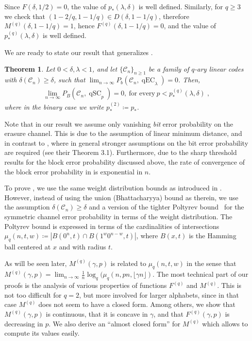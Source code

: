 \documentclass{article}
\DeclareMathOperator{\qSC}{qSC}
\DeclareMathOperator{\qEC}{qEC}
\newcommand{\cC}{\mathcal{C}}
\theoremstyle{plain}
\theoremstyle{plain}
\newtheorem{theorem}[definition]{Theorem}%
\theoremstyle{plain}
\theoremstyle{plain}
\theoremstyle{plain}
\theoremstyle{plain}
\theoremstyle{plain}
\theoremstyle{plain}
\theoremstyle{plain}
\theoremstyle{plain}
\theoremstyle{remark}
\theoremstyle{remark}
\theoremstyle{remark}
\theoremstyle{plain}
\begin{document}
Since $F(\delta,1/2)=0$, the value of
$p_{*}(\lambda,\delta)$ is well defined.
Similarly, for $q\ge 3$ we check that
$(1-2/q,1-1/q)\in D(\delta,1-1/q)$, therefore
$M^{(q)}(\delta,1-1/q)=1$,
hence $F^{(q)}(\delta,1-1/q)=0$, and
the value of $p_{*}^{(q)}(\lambda,\delta)$ is well defined.

We are ready to state our result
that generalizes .

\begin{theorem}
\label{Thm:1}
   Let $0<\delta,\lambda<1$, and let $\{\mathcal{C}_n\}_{n\ge1}$ be a family of $q$-ary linear codes with $\delta(\cC_n)\ge\delta$, such that $\lim_{n\to\infty}P_b(\cC_n,\qEC_{\lambda})=0$.
   Then,  
   \begin{align*}
       \underset{n\to\infty}{\lim}P_B(\cC_n,\qSC_p)=0,\ \text{for every}\ p<p_{*}^{(q)}(\lambda,\delta)\;,
   \end{align*}
   where in the binary case we write
   $p_*^{(2)}\coloneqq p_*$.
\end{theorem}

Note that in our result we assume only vanishing
\emph{bit} error probability on the erasure channel. This is due to the
assumption of linear minimum distance, and in contrast to 
\cite{hkazla2021codes}, where in general stronger assumptions 
on the bit error probability are required (see their Theorem 3.1).
Furthermore, due to the 
sharp threshold results for the block error probability discussed above, the rate of
convergence of the block error probability in 
is exponential in $n$.

To prove , we use the same weight distribution
bounds as introduced in \cite{hkazla2021codes,abawonse2025generalized}.
However, instead of using the union 
(Bhattacharyya) bound
as therein, we use the assumption $\delta(\cC_n)\ge\delta$ and a
version of the tighter 
Poltyrev bound~\cite{poltyrev2002bounds,pathegama2023smoothing}
for the symmetric channel error probability in terms of the weight distribution.
The Poltyrev bound is expressed in terms of the cardinalities of
intersections 
$\mu_q(n,t,w)\coloneqq|B(0^n,t)\cap B(1^w0^{n-w},t)|$, where $B(x,t)$ is the Hamming ball
centered at $x$ and with radius $t$. 

As will be seen later, $M^{(q)}(\gamma,p)$ is related
to $\mu_q(n,t,w)$ in the sense that 
$M^{(q)}(\gamma,p)=\lim_{n\to\infty}\frac{1}{n}\log_q(\mu_q(n,\allowbreak pn,\lfloor \gamma n\rfloor)$.
The most technical part of our proofs is
the analysis of various properties of
functions $F^{(q)}$ and
$M^{(q)}$. This is not too difficult for $q=2$,
but more involved for larger alphabets, since
in that case $M^{(q)}$ does not seem to have a closed form. Among others,
we show that $M^{(q)}(\gamma,p)$
is continuous, that it is concave in $\gamma$, 
and that $F^{(q)}(\gamma,p)$ is decreasing in $p$.
We also derive an ``almost closed form'' for 
$M^{(q)}$ which allows to compute its values easily.
\end{document}
